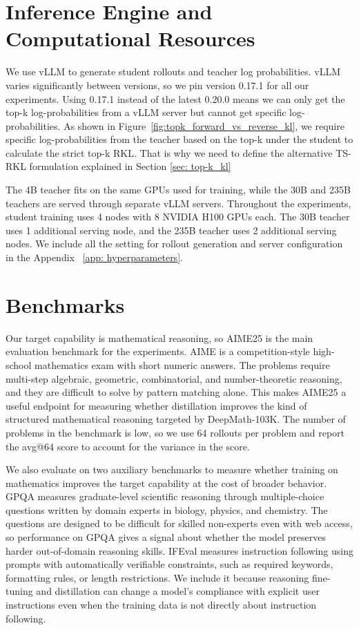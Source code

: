 \section{Inference Engine and Computational Resources} \label{sec: inference_engine}

We use vLLM \citep{kwon2023efficient} to generate student rollouts and teacher log probabilities. vLLM varies significantly between versions, so we pin version 0.17.1 for all our experiments. Using 0.17.1 instead of the latest 0.20.0 means we can only get the top-k log-probabilities from a vLLM server but cannot get specific log-probabilities. As shown in Figure~\ref{fig:topk_forward_vs_reverse_kl}, we require specific log-probabilities from the teacher based on the top-k under the student to calculate the strict top-k RKL. That is why we need to define the alternative TS-RKL formulation explained in Section \ref{sec: top-k_kl}

The 4B teacher fits on the same GPUs used for training, while the 30B and 235B teachers are served through separate vLLM servers. Throughout the experiments, student training uses 4 nodes with 8 NVIDIA H100 GPUs each. The 30B teacher uses 1 additional serving node, and the 235B teacher uses 2 additional serving nodes. We include all the setting for rollout generation and server configuration in the Appendix ~\ref{app: hyperparameters}.


\section{Benchmarks}

Our target capability is mathematical reasoning, so AIME25 \citep{aime25} is the main evaluation benchmark for the experiments. AIME is a competition-style high-school mathematics exam with short numeric answers. The problems require multi-step algebraic, geometric, combinatorial, and number-theoretic reasoning, and they are difficult to solve by pattern matching alone. This makes AIME25 a useful endpoint for measuring whether distillation improves the kind of structured mathematical reasoning targeted by DeepMath-103K. The number of problems in the benchmark is low, so we use 64 rollouts per problem and report the avg@64 score to account for the variance in the score.

We also evaluate on two auxiliary benchmarks to measure whether training on mathematics improves the target capability at the cost of broader behavior. GPQA \citep{reinGPQAGraduateLevelGoogleProof2023} measures graduate-level scientific reasoning through multiple-choice questions written by domain experts in biology, physics, and chemistry. The questions are designed to be difficult for skilled non-experts even with web access, so performance on GPQA gives a signal about whether the model preserves harder out-of-domain reasoning skills. IFEval \citep{zhou2023instructionfollowingevaluationlargelanguage} measures instruction following using prompts with automatically verifiable constraints, such as required keywords, formatting rules, or length restrictions. We include it because reasoning fine-tuning and distillation can change a model's compliance with explicit user instructions even when the training data is not directly about instruction following.

